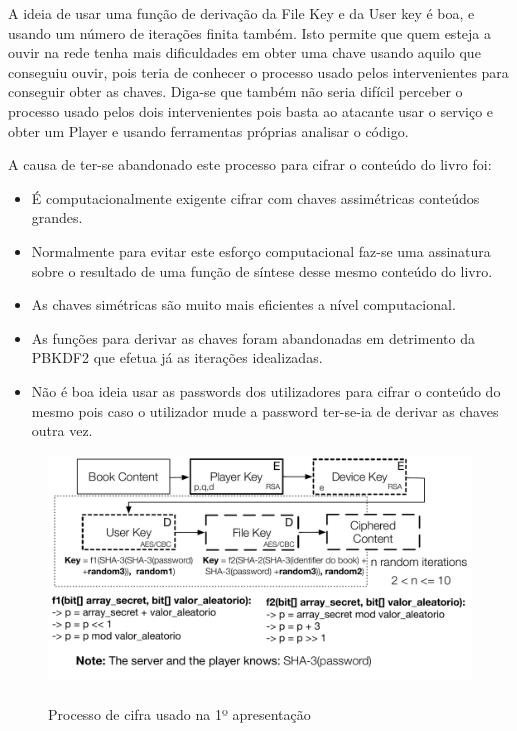 \documentclass[pdftex,12pt,a4paper]{report}
\begin{document}
A ideia de usar uma função de derivação da File Key e da User key é boa, e usando um número de iterações finita também. Isto permite que quem esteja a ouvir na rede tenha mais dificuldades em obter uma chave usando aquilo que conseguiu ouvir, pois teria de conhecer o processo usado pelos intervenientes para conseguir obter as chaves. Diga-se que também não seria difícil perceber o processo usado pelos dois intervenientes pois basta ao atacante usar o serviço e obter um Player e usando ferramentas próprias analisar o código.

A causa de ter-se abandonado este processo para cifrar o conteúdo do livro foi:

\begin{itemize}  
        \item É computacionalmente exigente cifrar com chaves assimétricas conteúdos grandes.
        \item Normalmente para evitar este esforço computacional faz-se uma assinatura sobre o resultado de uma função de síntese desse mesmo conteúdo do livro.
        \item As chaves simétricas são muito mais eficientes a nível computacional.
        \item As funções para derivar as chaves foram abandonadas em detrimento da PBKDF2 que efetua já as iterações idealizadas.
        \item Não é boa ideia usar as passwords dos utilizadores para cifrar o conteúdo do mesmo pois caso o utilizador mude a password ter-se-ia de derivar as chaves outra vez.
\pagebreak
                
\end{itemize}

\begin{figure}[!htb]
\center
 \includegraphics[width=135mm,scale=1]{filekey-initial-crypt.pdf}
 \caption{\\Processo de cifra usado na 1º apresentação}\label{fig:eer}
\end{figure}
\end{document}
